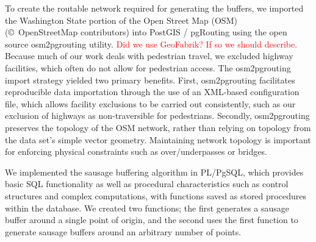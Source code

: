\documentclass[11pt,letterpaper]{article} %
\begin{document}
To create the routable network required for generating the buffers, we
imported the Washington State portion of the Open Street Map (OSM) (\copyright\ OpenStreetMap contributors)
into PostGIS / pgRouting using the open source osm2pgrouting
utility. \textcolor{red}{Did we use GeoFabrik? If so we should describe.} Because much of our work deals with pedestrian travel, we
excluded highway facilities, which often do not allow for pedestrian
access. The osm2pgrouting import strategy yielded two primary
benefits. First, osm2pgrouting facilitates reproducible data
importation through the use of an XML-based configuration file, which 
allows facility exclusions to be carried out consistently, such as our exclusion of highways as non-traversible for
pedestrians. Secondly, osm2pgrouting
preserves the topology of the OSM network, rather than relying on
topology from the data set's simple vector geometry. Maintaining network topology is important for enforcing physical constraints such as over/underpasses or bridges.


We implemented the sausage buffering algorithm in PL/PgSQL, which provides basic SQL functionality as well as procedural characteristics such as control structures and complex computations, with functions saved as stored procedures within the database. We created two functions; the first generates a
sausage buffer around a single point of origin, and the second uses
the first function to generate sausage buffers around an arbitrary
number of points.
\end{document}
